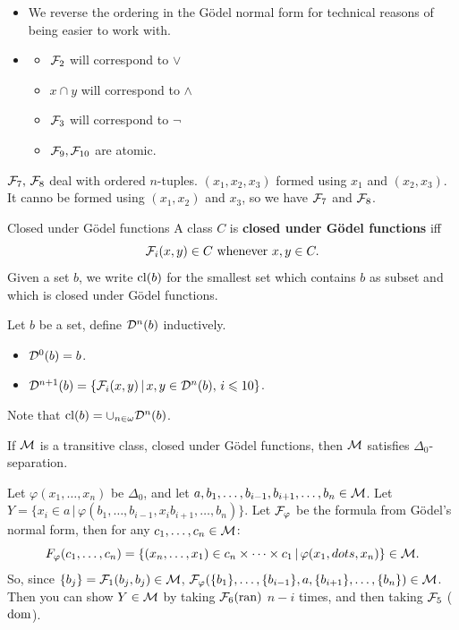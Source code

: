 \documentclass{article}
\begin{document}
\begin{remark*}\hspace{0.1cm}\begin{itemize}
        \item We reverse the ordering in the G\"odel normal form for technical reasons of being easier to work with.
        \item \begin{itemize}
                  \item $\mathcal{F}_{2}$ will correspond to $\vee$
                  \item $x \cap y$ will correspond to $\wedge$
                  \item $\mathcal{F}_{3}$ will correspond to $\neg$
                  \item $\mathcal{F}_{9}, \mathcal{F}_{10}$ are atomic.
              \end{itemize}
    \end{itemize}
    \item $\mathcal{F}_{7}, \, \mathcal{F}_{8}$ deal with ordered $n$-tuples. $(x_{1},x_{2},x_{3})$ formed using $x_{1}$ and $(x_{2},x_{3})$. It canno be formed using $(x_{1},x_{2})$ and $x_{3}$, so we have $\mathcal{F}_{7}$ and $\mathcal{F}_{8}$.
\end{remark*}
\begin{fancydefine}{Closed under G\"odel functions}
    A class $C$ is \textbf{closed under G\"odel functions} iff \[ \mathcal{F}_{i}(x,y) \in C \text{ whenever } x,y \in C.\]
    Given a set $b$, we write $\operatorname{cl}(b)$ for the smallest set which contains $b$ as subset and which is closed under G\"odel functions.
\end{fancydefine}
\begin{fancydefine}{}
    Let $b$ be a set, define $\mathcal{D}^{n}(b)$ inductively. \begin{itemize}
        \item $\mathcal{D}^{0}(b) = b$.
        \item $\mathcal{D}^{n+1}(b) = \{ \mathcal{F}_{i}(x,y) \, | \, x,y \in \mathcal{D}^{n}(b),\, i \leqslant 10 \}$.
    \end{itemize}
    Note that $\operatorname{cl}(b) = \cup_{n \in \omega} \mathcal{D}^{n}(b)$.
\end{fancydefine}
\begin{fancylem}{}
    If $\mathcal{M}$ is a transitive class, closed under G\"odel functions, then $\mathcal{M}$ satisfies $\Delta_{0}$-separation.
\end{fancylem}
\proof Let $\varphi(x_{1},\dots, x_{n})$ be $\Delta_{0}$, and let $a,b_{1},\dots,b_{i-1},b_{i+1},\dots,b_{n} \in \mathcal{M}$.\gap
Let $Y = \{ x_{i} \in a \, | \, \varphi(b_{1}, \dots, b_{i-1}, x_{i} b_{i+1}, \dots, b_{n})\}$. Let $\mathcal{F}_{\varphi}$ be the formula from G\"odel's normal form, then for any $c_{1},\dots, c_{n} \in \mathcal{M}$: \[ F_{\varphi}(c_{1},\dots,c_{n}) = \{(x_{n}, \dots, x_{1}) \in c_{n} \times \dots \times c_{1} \, | \, \varphi(x_{1},dots,x_{n})\} \in \mathcal{M}.\]
So, since $\{b_{j}\} = \mathcal{F}_{1}(b_{j},b_{j}) \in \mathcal{M}$, $\mathcal{F}_{\varphi}(\{b_{1}\}, \dots, \{b_{i-1}\}, a, \{b_{i+1}\}, \dots, \{b_{n}\}) \in \mathcal{M}$. Then you can show $Y \in \mathcal{M}$ by taking $\mathcal{F}_{6}(\operatorname{ran})$ $n-i$ times, and then taking $\mathcal{F}_{5}$ ($\operatorname{dom}$). \endproof
\end{document}
